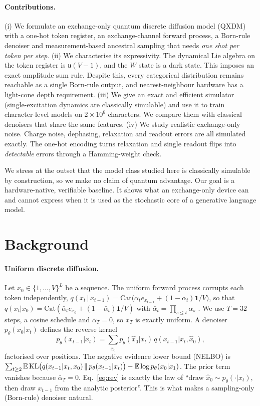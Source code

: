 \paragraph{Contributions.}
(i) We formulate an exchange-only quantum discrete diffusion model (QXDM) with a one-hot token
register, an exchange-channel forward process, a Born-rule denoiser and measurement-based ancestral
sampling that needs \emph{one shot per token per step}.
(ii) We characterise its expressivity. The dynamical Lie algebra on the token register is
$\mathfrak{u}(V\!-\!1)$, and the $W$ state is a dark state. This imposes an exact amplitude sum rule.
Despite this, every categorical distribution remains reachable as a single Born-rule output, and
nearest-neighbour hardware has a light-cone depth requirement.
(iii) We give an exact and efficient simulator (single-excitation dynamics are classically simulable)
and use it to train character-level models on $2\times 10^6$ characters. We compare them with
classical denoisers that share the same features.
(iv) We study realistic exchange-only noise. Charge noise, dephasing, relaxation and readout errors
are all simulated exactly. The one-hot encoding turns relaxation and single readout flips into
\emph{detectable} errors through a Hamming-weight check.

We stress at the outset that the model class studied here is classically simulable by construction,
so we make no claim of quantum advantage. Our goal is a hardware-native, verifiable baseline. It shows
what an exchange-only device can and cannot express when it is used as the stochastic core of a
generative language model.

\section{Background}
\paragraph{Uniform discrete diffusion.}
Let $x_0\in\{1,\dots,V\}^L$ be a sequence. The uniform forward process corrupts each token
independently,
$q(x_t\,|\,x_{t-1}) = \mathrm{Cat}\big(\alpha_t e_{x_{t-1}} + (1-\alpha_t)\mathbf{1}/V\big)$,
so that $q(x_t|x_0)=\mathrm{Cat}(\bar\alpha_t e_{x_0}+(1-\bar\alpha_t)\mathbf{1}/V)$ with
$\bar\alpha_t=\prod_{s\le t}\alpha_s$ \citep{austin2021structured,hoogeboom2021argmax}. We use $T=32$
steps, a cosine schedule and $\bar\alpha_T=0$, so $x_T$ is exactly uniform. A denoiser
$p_\theta(x_0|x_t)$ defines the reverse kernel
\begin{equation}
p_\theta(x_{t-1}|x_t)=\sum_{\hat x_0} p_\theta(\hat x_0|x_t)\, q(x_{t-1}|x_t,\hat x_0),
\label{eq:rev}
\end{equation}
factorised over positions. The negative evidence lower bound (NELBO) is
$\sum_{t\ge2}\mathbb{E}\,\mathrm{KL}\big(q(x_{t-1}|x_t,x_0)\,\|\,p_\theta(x_{t-1}|x_t)\big)
-\mathbb{E}\log p_\theta(x_0|x_1)$. The prior term vanishes because $\bar\alpha_T=0$. Eq.~\eqref{eq:rev} is
exactly the law of ``draw $\hat x_0\sim p_\theta(\cdot|x_t)$, then draw $x_{t-1}$ from the analytic
posterior''. This is what makes a sampling-only (Born-rule) denoiser natural.

